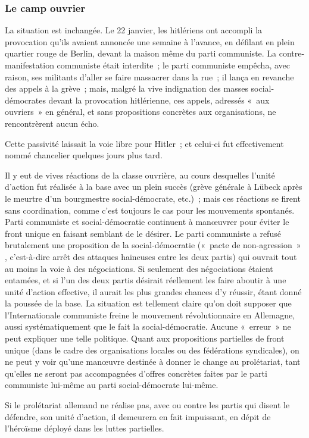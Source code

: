 \documentclass[french,twoside]{book} %
\begin{document}
\subsubsection[{Le camp ouvrier}]{Le camp ouvrier}
\noindent La situation est inchangée. Le 22 janvier, les hitlériens ont accompli la provocation qu'ils avaient annoncée une semaine à l'avance, en défilant en plein quartier rouge de Berlin, devant la maison même du parti communiste. La contre-manifestation communiste était interdite ; le parti communiste empêcha, avec raison, ses militants d'aller se faire massacrer dans la rue ; il lança en revanche des appels à la grève ; mais, malgré la vive indignation des masses social-démocrates devant la provocation hitlérienne, ces appels, adressés « aux ouvriers » en général, et sans propositions concrètes aux organisations, ne rencontrèrent aucun écho.\par
Cette passivité laissait la voie libre pour Hitler ; et celui-ci fut effective­ment nommé chancelier quelques jours plus tard.\par
Il y eut de vives réactions de la classe ouvrière, au cours desquelles l'unité d'action fut réalisée à la base avec un plein succès (grève générale à Lübeck après le meurtre d'un bourgmestre social-démocrate, etc.) ; mais ces réactions se firent sans coordination, comme c'est toujours le cas pour les mouvements spontanés. Parti communiste et social-démocratie continuent à manœuvrer pour éviter le front unique en faisant semblant de le désirer. Le parti commu­niste a refusé brutalement une proposition de la social-démocratie (« pacte de non-agression » , c'est-à-dire arrêt des attaques haineuses entre les deux partis) qui ouvrait tout au moins la voie à des négociations. Si seulement des négociations étaient entamées, et si l'un des deux partis désirait réellement les faire aboutir à une unité d'action effective, il aurait les plus grandes chances d'y réussir, étant donné la poussée de la base. La situation est tellement claire qu'on doit supposer que l'Internationale communiste freine le mouvement révolutionnaire en Allemagne, aussi systématiquement que le fait la social-démocratie. Aucune « erreur » ne peut expliquer une telle politique. Quant aux propositions partielles de front unique (dans le cadre des organisations locales ou des fédérations syndicales), on ne peut y voir qu'une manœuvre destinée à donner le change au prolétariat, tant qu'elles ne seront pas accompagnées d'offres concrètes faites par le parti communiste lui-même au parti social-démocrate lui-même.\par
Si le prolétariat allemand ne réalise pas, avec ou contre les partis qui disent le défendre, son unité d'action, il demeurera en fait impuissant, en dépit de l'héroïsme déployé dans les luttes partielles.\par
\end{document}

